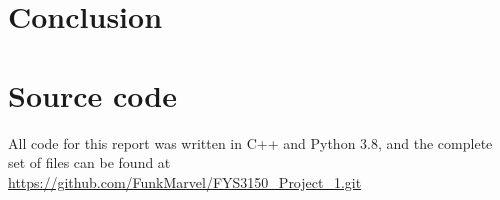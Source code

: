 \documentclass[english,notitlepage,reprint]{revtex4-1}  %
\begin{document}
\section{Conclusion} \label{sec:V}

{}

\appendix
\section{Source code}
All code for this report was written in C++ and Python 3.8, and the complete set of files can be found at \url{https://github.com/FunkMarvel/FYS3150_Project_1.git}
\end{document}
